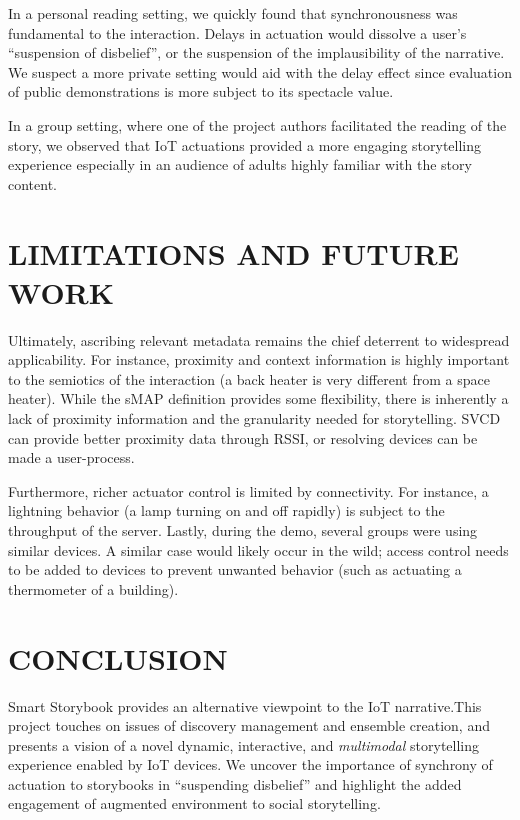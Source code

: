 \documentclass{sigchi}
\begin{document}
In a personal reading setting, we quickly found that synchronousness was fundamental to the interaction. Delays in actuation would dissolve a user's ``suspension of disbelief'', or the suspension of the implausibility of the narrative. We suspect a more private setting would aid with the delay effect since evaluation of public demonstrations is more subject to its spectacle value. 


In a group setting, where one of the project authors facilitated the reading of the story, we observed that IoT actuations provided a more engaging storytelling experience especially in an audience of adults highly familiar with the story content. 




\section{LIMITATIONS AND FUTURE WORK}
Ultimately, ascribing relevant metadata remains the chief deterrent to widespread applicability. For instance, proximity and context information is highly important to the semiotics of the interaction (a back heater is very different from a space heater). 
While the sMAP definition provides some flexibility, there is inherently a lack of proximity information and the granularity needed for storytelling. SVCD can provide better proximity data through RSSI, or resolving devices can be made a user-process.

Furthermore, richer actuator control is limited by connectivity. For instance, a lightning behavior (a lamp turning on and off rapidly) is subject to the throughput of the server.
Lastly, during the demo, several groups were using similar devices. A similar case would likely occur in the wild; access control needs to be added to devices to prevent unwanted behavior (such as actuating a thermometer of a building). 

\section{CONCLUSION}
Smart Storybook provides an alternative viewpoint to the IoT narrative.This project touches on issues of discovery management and ensemble creation, and presents a vision of a novel dynamic, interactive, and \textit{multimodal} storytelling experience enabled by IoT devices. We uncover the importance of synchrony of actuation to storybooks in ``suspending disbelief'' and highlight the added engagement of augmented environment to social storytelling. 
\end{document}
